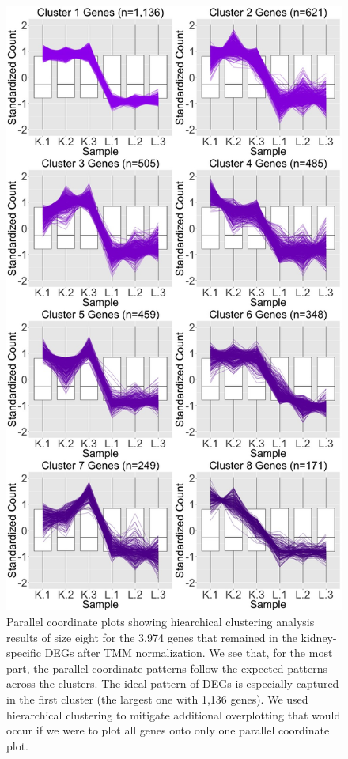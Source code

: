 \documentclass{article}
\begin{document}
\null
\begin{figure}[t!]
\centerline{\includegraphics[width=0.65\columnwidth]{../MakeFigures/lkClustersKeep.jpg}}
\caption{Parallel coordinate plots showing hiearchical clustering analysis results of size eight for the 3,974 genes that remained in the kidney-specific DEGs after TMM normalization. We see that, for the most part, the parallel coordinate patterns follow the expected patterns across the clusters. The ideal pattern of DEGs is especially captured in the first cluster (the largest one with 1,136 genes). We used hierarchical clustering to mitigate additional overplotting that would occur if we were to plot all genes onto only one parallel coordinate plot.
\label{lkClustersKeep}}
\end{figure}
\end{document}
